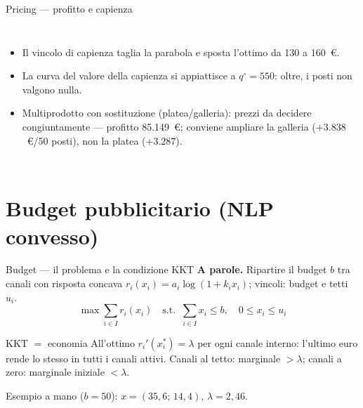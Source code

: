 \documentclass[11pt,aspectratio=169]{beamer}
\begin{document}
\begin{frame}{Pricing --- profitto e capienza}
\begin{columns}
\small
\begin{itemize}
  \item Il vincolo di capienza taglia la parabola e sposta l'ottimo da 130 a
        160~\euro.
  \item La curva del valore della capienza si appiattisce a $q^\circ = 550$: oltre,
        i posti non valgono nulla.
  \item Multiprodotto con sostituzione (platea/galleria): prezzi da decidere
        \alert{congiuntamente} --- profitto 85.149~\euro; conviene ampliare la
        galleria ($+3.838$~\euro/50 posti), non la platea ($+3.287$).
\end{itemize}
\end{columns}
\end{frame}

\section{Budget pubblicitario (NLP convesso)}

\begin{frame}{Budget --- il problema e la condizione KKT}
\textbf{A parole.} Ripartire il budget $b$ tra canali con risposta concava
$r_i(x_i) = a_i \log(1 + k_i x_i)$; vincoli: budget e tetti $u_i$.
\[
\max \sum_{i \in I} r_i(x_i) \quad \text{s.t.}\;\; \sum_{i \in I} x_i \le b,
\quad 0 \le x_i \le u_i
\]
\begin{block}{KKT $=$ economia}
All'ottimo $r_i'(x_i^*) = \lambda$ per ogni canale interno:
\alert{l'ultimo euro rende lo stesso in tutti i canali attivi}. Canali al tetto:
marginale $> \lambda$; canali a zero: marginale iniziale $< \lambda$.
\end{block}
Esempio a mano ($b = 50$): $x = (35{,}6;\, 14{,}4)$, $\lambda = 2{,}46$.
\end{frame}
\end{document}
